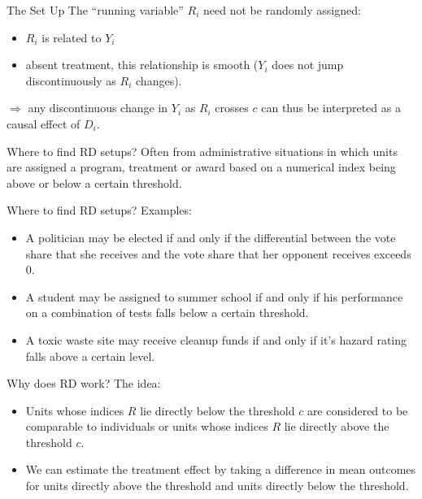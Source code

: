 \documentclass[
  ignorenonframetext,
]{beamer}
\begin{document}
\begin{frame}{The Set Up}
\protect\hypertarget{the-set-up-1}{}
The ``running variable'' \(R_i\) need not be randomly assigned:

\begin{itemize}
\item
  \(R_i\) is related to \(Y_i\)
\item
  absent treatment, this relationship is smooth (\(Y_i\) does not jump
  discontinuously as \(R_i\) changes).
\end{itemize}

\(\Rightarrow\) any discontinuous change in \(Y_i\) as \(R_i\) crosses
\(c\) can thus be interpreted as a causal effect of \(D_i\).
\end{frame}

\begin{frame}{Where to find RD setups?}
\protect\hypertarget{where-to-find-rd-setups}{}
Often from administrative situations in which units are assigned a
program, treatment or award based on a numerical index being above or
below a certain threshold.
\end{frame}

\begin{frame}{Where to find RD setups?}
\protect\hypertarget{where-to-find-rd-setups-1}{}
Examples:

\begin{itemize}
\item
  A politician may be elected if and only if the differential between
  the vote share that she receives and the vote share that her opponent
  receives exceeds 0.
\item
  A student may be assigned to summer school if and only if his
  performance on a combination of tests falls below a certain threshold.
\item
  A toxic waste site may receive cleanup funds if and only if it's
  hazard rating falls above a certain level.
\end{itemize}
\end{frame}

\begin{frame}{Why does RD work?}
\protect\hypertarget{why-does-rd-work}{}
The idea:

\begin{itemize}
\item
  Units whose indices \(R\) lie directly below the threshold \(c\) are
  considered to be comparable to individuals or units whose indices
  \(R\) lie directly above the threshold \(c\).
\item
  We can estimate the treatment effect by taking a difference in mean
  outcomes for units directly above the threshold and units directly
  below the threshold.
\end{itemize}
\end{frame}
\end{document}

